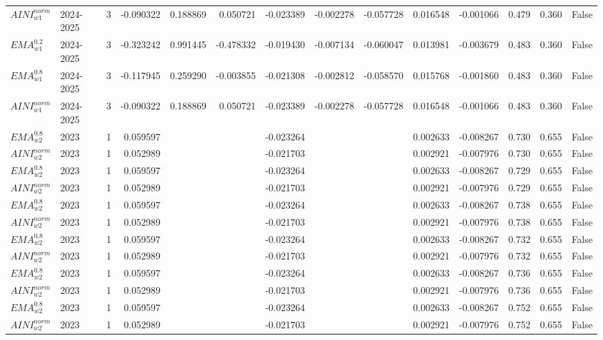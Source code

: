 \begin{tabular}{@{}llrrrrrrrrrlll@{}}
$AINI^{norm}_{w1}$ & 2024-2025 & 3 & -0.090322 & 0.188869 & 0.050721 & -0.023389 & -0.002278 & -0.057728 & 0.016548 & -0.001066 & 0.479 & 0.360 & False \\
$EMA^{0.2}_{w1}$ & 2024-2025 & 3 & -0.323242 & 0.991445 & -0.478332 & -0.019430 & -0.007134 & -0.060047 & 0.013981 & -0.003679 & 0.483 & 0.360 & False \\
$EMA^{0.8}_{w1}$ & 2024-2025 & 3 & -0.117945 & 0.259290 & -0.003855 & -0.021308 & -0.002812 & -0.058570 & 0.015768 & -0.001860 & 0.483 & 0.360 & False \\
$AINI^{norm}_{w1}$ & 2024-2025 & 3 & -0.090322 & 0.188869 & 0.050721 & -0.023389 & -0.002278 & -0.057728 & 0.016548 & -0.001066 & 0.483 & 0.360 & False \\
$EMA^{0.8}_{w2}$ & 2023 & 1 & 0.059597 &  &  & -0.023264 &  &  & 0.002633 & -0.008267 & 0.730 & 0.655 & False \\
$AINI^{norm}_{w2}$ & 2023 & 1 & 0.052989 &  &  & -0.021703 &  &  & 0.002921 & -0.007976 & 0.730 & 0.655 & False \\
$EMA^{0.8}_{w2}$ & 2023 & 1 & 0.059597 &  &  & -0.023264 &  &  & 0.002633 & -0.008267 & 0.729 & 0.655 & False \\
$AINI^{norm}_{w2}$ & 2023 & 1 & 0.052989 &  &  & -0.021703 &  &  & 0.002921 & -0.007976 & 0.729 & 0.655 & False \\
$EMA^{0.8}_{w2}$ & 2023 & 1 & 0.059597 &  &  & -0.023264 &  &  & 0.002633 & -0.008267 & 0.738 & 0.655 & False \\
$AINI^{norm}_{w2}$ & 2023 & 1 & 0.052989 &  &  & -0.021703 &  &  & 0.002921 & -0.007976 & 0.738 & 0.655 & False \\
$EMA^{0.8}_{w2}$ & 2023 & 1 & 0.059597 &  &  & -0.023264 &  &  & 0.002633 & -0.008267 & 0.732 & 0.655 & False \\
$AINI^{norm}_{w2}$ & 2023 & 1 & 0.052989 &  &  & -0.021703 &  &  & 0.002921 & -0.007976 & 0.732 & 0.655 & False \\
$EMA^{0.8}_{w2}$ & 2023 & 1 & 0.059597 &  &  & -0.023264 &  &  & 0.002633 & -0.008267 & 0.736 & 0.655 & False \\
$AINI^{norm}_{w2}$ & 2023 & 1 & 0.052989 &  &  & -0.021703 &  &  & 0.002921 & -0.007976 & 0.736 & 0.655 & False \\
$EMA^{0.8}_{w2}$ & 2023 & 1 & 0.059597 &  &  & -0.023264 &  &  & 0.002633 & -0.008267 & 0.752 & 0.655 & False \\
$AINI^{norm}_{w2}$ & 2023 & 1 & 0.052989 &  &  & -0.021703 &  &  & 0.002921 & -0.007976 & 0.752 & 0.655 & False \\

\end{tabular}
